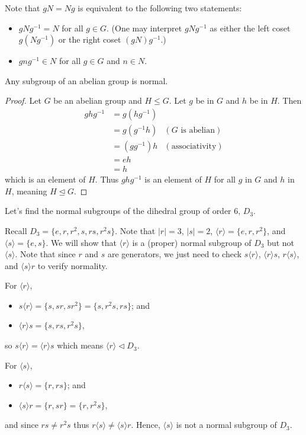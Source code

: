 Note that $gN = Ng$ is equivalent to the following two statements:
\begin{itemize}
    \item $gNg^{-1} = N$ for all $g \in G$. (One may interpret $gNg^{-1}$ as either the left coset $g(Ng^{-1})$ or the right coset $(gN)g^{-1}$.)
    \item $gng^{-1} \in N$ for all $g \in G$ and $n \in N$.
\end{itemize}

\begin{proposition}\label{prop-subgroup-of-abelian-group-is-normal}
    Any subgroup of an abelian group is normal.
\end{proposition}
\begin{proof}
    Let $G$ be an abelian group and $H \leq G$. Let $g$ be in $G$ and $h$ be in $H$. Then
    \begin{align*}
        ghg^{-1} &= g(hg^{-1})\\
        &= g(g^{-1}h) & (G \text{ is abelian})\\
        &= (gg^{-1})h & (\text{associativity})\\
        &= eh\\
        &= h
    \end{align*}
    which is an element of $H$. Thus $ghg^{-1}$ is an element of $H$ for all $g$ in $G$ and $h$ in $H$, meaning $H \unlhd G$.
\end{proof}

\begin{example}\label{example-normal-subgroups-of-d3}
    Let's find the normal subgroups of the dihedral group of order 6, $D_3$.

    Recall $D_3 = \{e, r, r^2, s, rs, r^2s\}$. Note that $|r| = 3$, $|s| = 2$, $\langle r \rangle = \{e, r, r^2\}$, and $\langle s \rangle = \{e, s\}$. We will show that $\langle r \rangle$ is a (proper) normal subgroup of $D_3$ but not $\langle s \rangle$. Note that since $r$ and $s$ are generators, we just need to check $s\langle r\rangle$, $\langle r\rangle s$, $r\langle s\rangle$, and $\langle s\rangle r$ to verify normality.

    \newpage

    For $\langle r \rangle$,
    \begin{itemize}
        \item $s\langle r\rangle = \{s, sr, sr^2\} = \{s, r^2s, rs\}$; and
        \item $\langle r\rangle s = \{s, rs, r^2s\}$,
    \end{itemize}
    so $s\langle r\rangle = \langle r \rangle s$ which means $\langle r \rangle \lhd D_3$.

    For $\langle s \rangle$,
    \begin{itemize}
        \item $r\langle s\rangle = \{r, rs\}$; and
        \item $\langle s \rangle r = \{r, sr\} = \{r, r^2s\}$,
    \end{itemize}
    and since $rs \neq r^2s$ thus $r\langle s\rangle \neq \langle s \rangle r$. Hence, $\langle s \rangle$ is not a normal subgroup of $D_3$.
\end{example}

